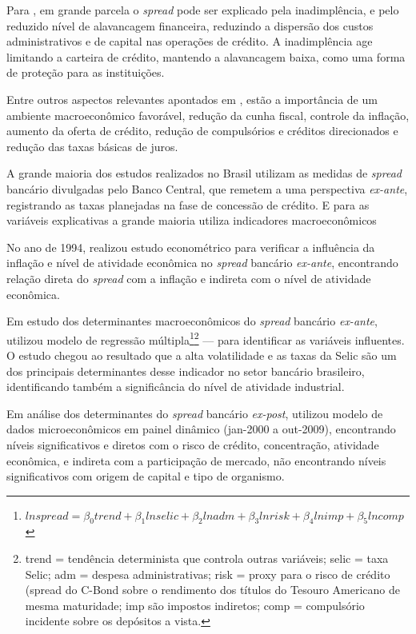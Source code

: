\documentclass[
  12pt,
  12pt,
  openright,
  oneside,
  a4paper,
  chapter=TITLE,
  section=TITLE,
  subsection=TITLE,
  subsubsection=TITLE,
  english,
  portugues,
  sumario=tradicional]{abntex2}
\begin{document}
Para \textcite{BCB:1999}, em grande parcela o \emph{spread} pode ser explicado pela inadimplência, e pelo reduzido nível de alavancagem financeira, reduzindo a dispersão dos custos administrativos e de capital nas operações de crédito. A inadimplência age limitando a carteira de crédito, mantendo a alavancagem baixa, como uma forma de proteção para as instituições.

Entre outros aspectos relevantes apontados em \textcite{BCB:1999}, estão a importância de um ambiente macroeconômico favorável, redução da cunha fiscal, controle da inflação, aumento da oferta de crédito, redução de compulsórios e créditos direcionados e redução das taxas básicas de juros.

A grande maioria dos estudos realizados no Brasil utilizam as medidas de
\emph{spread} bancário divulgadas pelo Banco Central, que remetem a uma perspectiva
\emph{ex-ante}, registrando as taxas planejadas na fase de concessão de crédito. E
para as variáveis explicativas a grande maioria utiliza indicadores
macroeconômicos \cite{dantas:2012}

No ano de 1994, \textcite{aronovich:1994} realizou estudo econométrico para
verificar a influência da inflação e nível de atividade econômica no \emph{spread}
bancário \emph{ex-ante}, encontrando relação direta do \emph{spread} com a inflação e
indireta com o nível de atividade econômica.

Em estudo dos determinantes macroeconômicos do \emph{spread} bancário \emph{ex-ante}, \textcite{oreiro-2006} utilizou modelo de regressão múltipla\footnote{$ln spread = \beta_0 trend + \beta_1 ln selic + \beta_2 ln adm + \beta_3 ln risk + \beta_4 ln imp + \beta_5 ln comp$}\footnote{trend = tendência determinista que controla outras variáveis; selic = taxa Selic; adm = despesa administrativas; risk =  proxy para o risco de crédito (spread do C-Bond sobre o rendimento dos títulos do Tesouro Americano de mesma maturidade; imp são impostos indiretos; comp = compulsório incidente sobre os depósitos a vista.} --- para identificar as variáveis influentes. O estudo chegou ao resultado que a alta volatilidade e as taxas da Selic são um dos principais determinantes desse indicador no setor bancário brasileiro, identificando também a significância do nível de atividade industrial.

Em análise dos determinantes do \emph{spread} bancário \emph{ex-post}, \textcite{dantas:2012} utilizou modelo de dados microeconômicos em painel dinâmico (jan-2000 a out-2009), encontrando níveis significativos e diretos com o risco de crédito, concentração, atividade econômica, e indireta com a participação de mercado, não encontrando níveis significativos com origem de capital e tipo de organismo.
\end{document}
